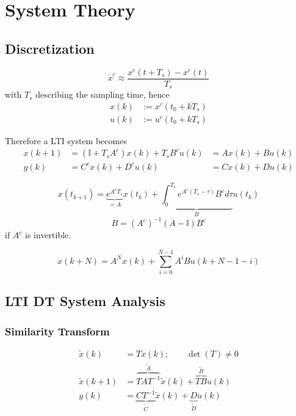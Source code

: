\section{System Theory}
\subsection{Discretization}
\begin{equation*}
    \dot{x}^c \approx \frac{x^c(t + T_s)-x^c(t)}{T_s}
\end{equation*}
with $T_s$ describing the sampling time, hence
\begin{align*}
    x(k) & := x^c(t_0 + kT_s) \\
    u(k) & := u^c(t_0 + kT_s)
\end{align*}

Therefore a LTI system becomes
\begin{align*}
    x(k+1) & = (\mathbb{I} + T_s A^c) x(k) + T_s B^c u(k) & = A x(k) + B u(k) \\
    y(k)   & = C^c x(k) + D^c u(k)                        & = C x(k) + D u(k)
\end{align*}

\newpar{}
\begin{equation*}
    x(t_{k+1}) = \underbrace{e^{A^c T_s}}_{=A} x(t_k) + \underbrace{\int_{0}^{T_s} e^{A^c(T_s - \tau)}B^c d\tau}_{B} u(t_k)
\end{equation*}
\begin{equation*}
    B={(A^c)}^{-1}(A-\mathbb{I})B^c
\end{equation*}
if $A^c$ is invertible.

\newpar{}
\begin{equation*}
    x(k+N) = A^N x(k) + \sum_{i=0}^{N-1} A^i B u(k+N-1-i)
\end{equation*}

\subsection{LTI DT System Analysis}
\subsubsection{Similarity Transform}
\noindent
\begin{align*}
    \widetilde{x}(k)   & = Tx(k); \qquad \det(T) \neq 0                                                                \\
    \widetilde{x}(k+1) & = \overbrace{TAT^{-1}}^{\widetilde{A}} \widetilde{x}(k) + \overbrace{TB}^{\widetilde{B}} u(k) \\
    y(k)               & = \underbrace{CT^{-1}}_{\widetilde{C}} \widetilde{x}(k) + \underbrace{D}_{\widetilde{D}}u(k)
\end{align*}

